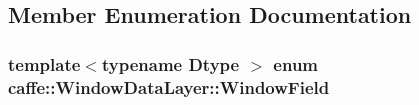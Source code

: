 \subsection{Member Enumeration Documentation}
\hypertarget{classcaffe_1_1_window_data_layer_a9ca81b56644734daf53ea5ac8ad5ef07}{
\subsubsection[{Window\+Field}]{\setlength{\rightskip}{0pt plus 5cm}template$<$typename Dtype $>$ enum {\bf caffe\+::\+Window\+Data\+Layer\+::\+Window\+Field}\hspace{0.3cm}{\ttfamily [protected]}}}\label{classcaffe_1_1_window_data_layer_a9ca81b56644734daf53ea5ac8ad5ef07}

